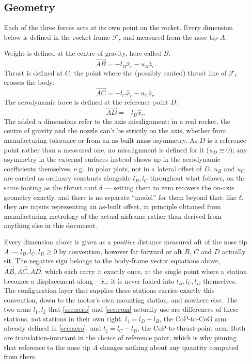 \subsection{Geometry}\label{sec:geometry}
Each of the three forces acts at its own point on the rocket. Every dimension below is defined in
the rocket frame $\mathcal{F}_r$ and measured from the nose tip $A$.

Weight is defined at the centre of gravity, here called $B$:
\begin{equation}
    \vec{AB} = -l_B\hat{x}_r - u_B\hat{z}_r.
\end{equation}
Thrust is defined at $C$, the point where the (possibly canted) thrust line of $\mathcal{F}_t$
crosses the body:
\begin{equation}
    \vec{AC} = -l_C\hat{x}_r - u_C\hat{z}_r.
\end{equation}
The aerodynamic force is defined at the reference point $D$:
\begin{equation}
    \vec{AD} = -l_D\hat{x}_r.
\end{equation}
The added $u$ dimensions refer to the axis misalignment: in a real rocket, the centre of gravity
and the nozzle can't be strictly on the axis, whether from manufacturing tolerance or from an
as-built mass asymmetry. As $D$ is a reference point rather than a measured one, no misalignment
is defined for it ($u_D\equiv0$); any asymmetry in the external surfaces instead shows up in the
aerodynamic coefficients themselves, e.g.\ in polar plots, not in a lateral offset of $D$. $u_B$
and $u_C$ are carried as ordinary constants alongside $l_B,l_C$ throughout what follows, on the
same footing as the thrust cant $\delta$ --- setting them to zero recovers the on-axis geometry
exactly, and there is no separate ``model'' for them beyond that: like $\delta$, they are inputs
representing an as-built offset, in principle obtained from manufacturing metrology of the actual
airframe rather than derived from anything else in this document.

Every dimension above is given as a \emph{positive} distance measured aft of the nose tip $A$ ---
$l_B,l_C,l_D\geq0$ by convention, however far forward or aft $B$, $C$ and $D$ actually sit. The
negative sign belongs to the body-frame vector equations above, $\vec{AB},\vec{AC},\vec{AD}$, which
each carry it exactly once, at the single point where a station becomes a displacement along
$-\hat{x}_r$; it is never folded into $l_B,l_C,l_D$ themselves. The configuration layer that
supplies these stations carries exactly this convention, down to the motor's own mounting station,
and nowhere else. The two arms $l_1,l_2$ that \autoref{sec:aero} and \autoref{sec:eom} actually use
are differences of these stations, not stations in their own right: $l_1=l_D-l_B$, the CoP-to-CoG
arm already defined in \autoref{sec:aero}, and $l_2=l_C-l_D$, the CoP-to-thrust-point arm. Both are
translation-invariant in the choice of reference point, which is why pinning that reference to the
nose tip $A$ changes nothing about any quantity computed from them.

